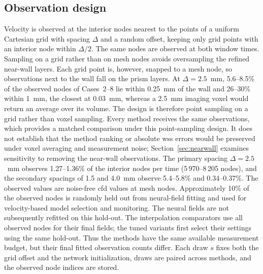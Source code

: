 \documentclass[12pt,a4paper]{article}
\newcommand{\CFD}{\ac{cfd}\xspace}
\newcommand{\WSS}{\ac{wss}\xspace}
\theoremstyle{definition}
\numberwithin{equation}{section}
\providecommand{\DIFaddtex}[1]{{\protect\color{blue} \sf #1}} %
\providecommand{\DIFdeltex}[1]{{\protect\color{red} \scriptsize #1}} %
\providecommand{\DIFaddbegin}{} %
\providecommand{\DIFaddend}{} %
\providecommand{\DIFdelbegin}{} %
\providecommand{\DIFdelend}{} %
\providecommand{\DIFadd}[1]{\texorpdfstring{\DIFaddtex{#1}}{#1}} %
\providecommand{\DIFdel}[1]{\texorpdfstring{\DIFdeltex{#1}}{}} %
\newcommand{\DIFscaledelfig}{0.5}
\newlength{\DIFdelgraphicswidth} %
\newlength{\DIFdelgraphicsheight} %
\newcommand{\DIFaddincludegraphics}[2][]{{\color{blue}\fbox{\DIFOincludegraphics[#1]{#2}}}} %
\newcommand{\DIFdelincludegraphics}[2][]{%
\sbox{\DIFdelgraphicsbox}{\DIFOincludegraphics[#1]{#2}}%
\settoboxwidth{\DIFdelgraphicswidth}{\DIFdelgraphicsbox} %
\settoboxtotalheight{\DIFdelgraphicsheight}{\DIFdelgraphicsbox} %
\scalebox{\DIFscaledelfig}{%
\parbox[b]{\DIFdelgraphicswidth}{\usebox{\DIFdelgraphicsbox}\\[-\baselineskip] \rule{\DIFdelgraphicswidth}{0em}}\llap{\resizebox{\DIFdelgraphicswidth}{\DIFdelgraphicsheight}{%
\setlength{\unitlength}{\DIFdelgraphicswidth}%
\begin{picture}(1,1)%
\thicklines\linethickness{2pt} %
{\color[rgb]{1,0,0}\put(0,0){\framebox(1,1){}}}%
{\color[rgb]{1,0,0}\put(0,0){\line( 1,1){1}}}%
{\color[rgb]{1,0,0}\put(0,1){\line(1,-1){1}}}%
\end{picture}%
}\hspace*{3pt}}} %
} %
\DeclareRobustCommand{\DIFaddbegin}{\DIFOaddbegin \let\includegraphics\DIFaddincludegraphics} %
\DeclareRobustCommand{\DIFaddend}{\DIFOaddend \let\includegraphics\DIFOincludegraphics} %
\DeclareRobustCommand{\DIFdelbegin}{\DIFOdelbegin \let\includegraphics\DIFdelincludegraphics} %
\DeclareRobustCommand{\DIFdelend}{\DIFOaddend \let\includegraphics\DIFOincludegraphics} %
\renewcommand{\DIFaddtex}[1]{{\protect\color{red}#1}}
\renewcommand{\DIFdeltex}[1]{}
\renewcommand{\DIFdel}[1]{}
\renewcommand{\DIFaddincludegraphics}[2][]{\DIFOincludegraphics[#1]{#2}}
\renewcommand{\DIFdelincludegraphics}[2][]{}
\def\DIFaddbegin{}\def\DIFaddend{}%
\def\DIFdelbegin{}\def\DIFdelend{}%
\begin{document}
\subsection{Observation design}
\label{sec:observations}
Velocity is observed at the interior nodes nearest to the points of a uniform Cartesian grid with spacing $\Delta$ and a random offset, keeping only grid points with an interior node within $\Delta/2$. The same nodes are observed at both window times. Sampling on a grid rather than on mesh nodes avoids oversampling the refined near-wall layers. Each grid point is, however, snapped to a mesh node, so observations next to the wall fall on the prism layers. At $\Delta=2.5$~mm, 5.6--8.5\% of the observed nodes of Cases~2--8 lie within 0.25~mm of the wall and 26--30\% within 1~mm, the closest at 0.03~mm, whereas a 2.5~mm imaging voxel would return an average over its volume. The design is therefore point sampling on a grid rather than voxel sampling. Every method receives the same observations, \DIFdelbegin \DIFdel{so the comparison between methods is not affected, but the }\DIFdelend \DIFaddbegin \DIFadd{which provides a matched comparison under this point-sampling design. It does not establish that the method ranking or }\DIFaddend absolute \WSS errors \DIFdelbegin \DIFdel{are optimistic relative to imaging data}\DIFdelend \DIFaddbegin \DIFadd{would be preserved under voxel averaging and measurement noise}\DIFaddend ; Section~\ref{sec:nearwall} \DIFdelbegin \DIFdel{quantifies this by }\DIFdelend \DIFaddbegin \DIFadd{examines sensitivity to }\DIFaddend removing the near-wall observations. The primary spacing $\Delta=2.5$~mm observes 1.27--1.36\% of the interior nodes per time (5\,970--8\,205 nodes), and the secondary spacings of 1.5 and 4.0~mm observe 5.4--5.8\% and 0.34--0.37\%. The observed values are noise-free \CFD values at mesh nodes. \DIFdelbegin \DIFdel{A random }\DIFdelend \DIFaddbegin \DIFadd{Approximately }\DIFaddend 10\% of the observed nodes is \DIFdelbegin \DIFdel{withheld from }\DIFdelend \DIFaddbegin \DIFadd{randomly held out from neural-field }\DIFaddend fitting and used \DIFdelbegin \DIFdel{only for }\DIFdelend \DIFaddbegin \DIFadd{for velocity-based }\DIFaddend model selection and monitoring. \DIFaddbegin \DIFadd{The neural fields are not subsequently refitted on this hold-out. The interpolation comparators use all observed nodes for their final fields; the tuned variants first select their settings using the same hold-out. Thus the methods have the same available measurement budget, but their final fitted observation counts differ. }\DIFaddend Each draw $s$ fixes both the grid offset and the network initialization, draws are paired across methods, and the observed node indices are stored.
\end{document}
